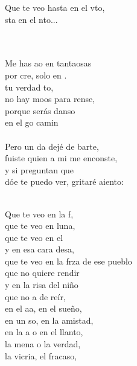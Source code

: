 \begin{cancion}
\begin{chorus}
	Que te veo hasta en el vto, \\
	sta en el nto...\\
	\end{chorus}%
	\jump\\
	   \\
	Me has ao en tantaosas \\
	por cre, solo en . \\
	 tu verdad to, \\
	no hay moos para rense,\\
	porque  serás danso \\
	en el go camin\\
\jump\\
	Pero un da dejé de barte, \\
	fuiste  quien a mi me enconste, \\
	y si  preguntan que \\
	dóe te puedo ver, gritaré aiento:\\\jump\\
	\begin{chorus}%
	Que te veo en la f, \\
	que te veo en luna,\\
	que te veo en el  \\
	y en esa cara desa,\\
	que te veo en la frza de ese pueblo\\
	que no  quiere rendir\\
	y en la risa del niño \\
	que no a de reír,\\
	en el aa, en el sueño, \\
	en un so, en la amistad,\\
	en la a o en el llanto, \\
	la mena o la verdad,\\
	la vicria, el fracaso, \\

\end{chorus}
\end{cancion}

